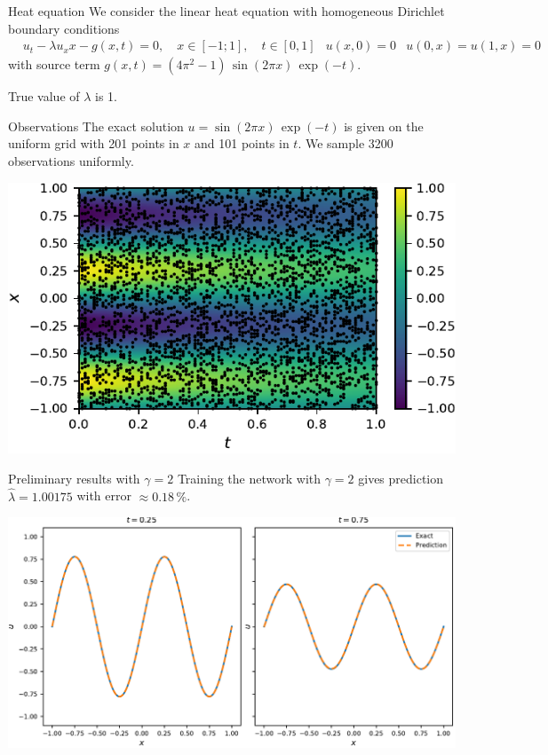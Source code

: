 \documentclass{beamer}
\def\\{}%
\begin{document}
\begin{frame}{Heat equation}
    We consider the linear heat equation with homogeneous Dirichlet boundary
    conditions
\begin{align*}
    &u_t - \lambda u_xx - g(x, t) = 0, \quad x\in[-1; 1], \quad t\in[0, 1] \\
    &u(x, 0) = 0 \\
    &u(0, x) = u(1, x) = 0
\end{align*}
with source term $g(x, t) = (4\pi^2 -1) \, \sin(2\pi x) \, \exp(-t)$.

True value of $\lambda$ is 1.
\end{frame}

\begin{frame}{Observations}
The exact solution $u = \sin(2\pi x) \, \exp(-t)$ is given on the uniform grid
with 201 points in $x$ and 101 points in $t$. 
We sample 3200 observations uniformly.

\centering
\includegraphics{images/heateq-observations}
\end{frame}

\begin{frame}{Preliminary results with $\gamma=2$}
Training the network with $\gamma=2$ gives prediction $\widehat{\lambda} =
1.00175$ with error $\approx 0.18 \,\%$.

\vspace{0.5cm}
\centering
\includegraphics[scale=0.55]{images/heateq-predictions}

\end{frame}
\end{document}
